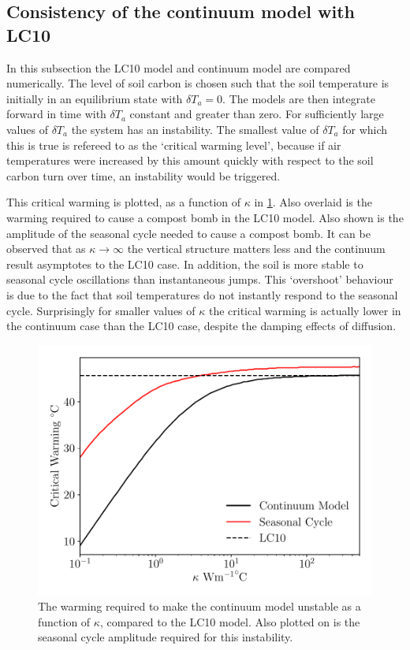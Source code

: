 \subsection{Consistency of the continuum model with LC10}
\label{sec:consistency_with_LC10}
In this subsection the LC10 model and continuum model are compared numerically. The level of soil carbon is chosen such that the soil temperature is
initially in an equilibrium state with $\delta T_{a} = 0$. The models are then integrate forward in time with $\delta T_a$ constant and greater than zero.
For sufficiently large values of $\delta T_a$ the system has an instability. The smallest value of $\delta T_a$ for which this is true is refereed to
as the `critical warming level', because if air temperatures were increased by this amount quickly with respect to the soil carbon turn over time,
an instability would be triggered.

This critical warming is plotted, as a function of $\kappa$ in \cref{fig:comparison_with_lc10}.
Also overlaid is the warming required to cause a compost bomb in the LC10
model. Also shown is the amplitude of the seasonal cycle needed to cause a compost bomb.
It can be observed that as $\kappa\rightarrow\infty$ the vertical structure matters less and the continuum result asymptotes to the LC10 case. In addition, the soil is more stable
to seasonal cycle oscillations than instantaneous jumps. This `overshoot' behaviour\cite{Ritchie2019,Ritchie2021} is due to the fact that soil temperatures do not instantly respond to the seasonal cycle.
Surprisingly for smaller values of $\kappa$ the critical warming is actually lower in the continuum case than the LC10 case,
despite the damping effects of diffusion.
\begin{figure}
  \centering
  \includegraphics[keepaspectratio,scale=0.5]{dimensional_continuum_vs_lc10}
  \caption[Critical warming level in the continuum compost bomb]{The warming required to make the continuum model unstable as a function of $\kappa$, compared to the LC10 model.
    Also plotted on is the seasonal cycle amplitude required for this instability.}
  \label{fig:comparison_with_lc10}
\end{figure}

